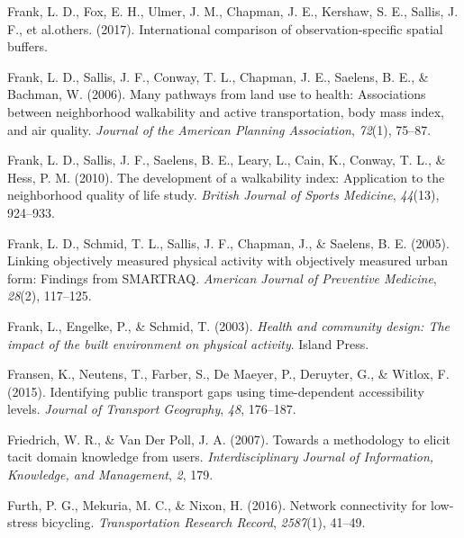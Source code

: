 \documentclass[
11pt, %
oneside, %
english, %
singlespacing, %
]{macthesis} %
\newlength{\cslhangindent}
\newenvironment{CSLReferences}[2] %
 {%
  \setlength{\parindent}{0pt}
  \ifodd #1 \everypar{\setlength{\hangindent}{\cslhangindent}}\ignorespaces\fi
  \ifnum #2 > 0
  \setlength{\parskip}{#2\baselineskip}
  \fi
 }%
 {}
\begin{document}
\begin{CSLReferences}{1}{0}
\leavevmode{}%
Frank, L. D., Fox, E. H., Ulmer, J. M., Chapman, J. E., Kershaw, S. E., Sallis, J. F., et al.others. (2017). International comparison of observation-specific spatial buffers.

\leavevmode{}%
Frank, L. D., Sallis, J. F., Conway, T. L., Chapman, J. E., Saelens, B. E., \& Bachman, W. (2006). Many pathways from land use to health: Associations between neighborhood walkability and active transportation, body mass index, and air quality. \emph{Journal of the American Planning Association}, \emph{72}(1), 75--87.

\leavevmode{}%
Frank, L. D., Sallis, J. F., Saelens, B. E., Leary, L., Cain, K., Conway, T. L., \& Hess, P. M. (2010). The development of a walkability index: Application to the neighborhood quality of life study. \emph{British Journal of Sports Medicine}, \emph{44}(13), 924--933.

\leavevmode{}%
Frank, L. D., Schmid, T. L., Sallis, J. F., Chapman, J., \& Saelens, B. E. (2005). Linking objectively measured physical activity with objectively measured urban form: Findings from SMARTRAQ. \emph{American Journal of Preventive Medicine}, \emph{28}(2), 117--125.

\leavevmode{}%
Frank, L., Engelke, P., \& Schmid, T. (2003). \emph{Health and community design: The impact of the built environment on physical activity}. Island Press.

\leavevmode{}%
Fransen, K., Neutens, T., Farber, S., De Maeyer, P., Deruyter, G., \& Witlox, F. (2015). Identifying public transport gaps using time-dependent accessibility levels. \emph{Journal of Transport Geography}, \emph{48}, 176--187.

\leavevmode{}%
Friedrich, W. R., \& Van Der Poll, J. A. (2007). Towards a methodology to elicit tacit domain knowledge from users. \emph{Interdisciplinary Journal of Information, Knowledge, and Management}, \emph{2}, 179.

\leavevmode{}%
Furth, P. G., Mekuria, M. C., \& Nixon, H. (2016). Network connectivity for low-stress bicycling. \emph{Transportation Research Record}, \emph{2587}(1), 41--49.


\end{CSLReferences}
\end{document}
